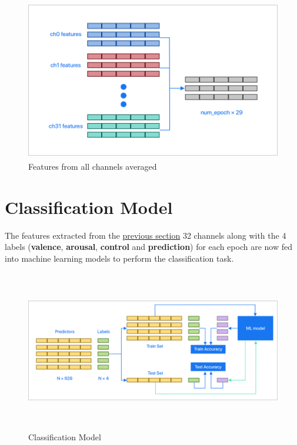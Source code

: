 \begin{figure}[H]
\centering
\includegraphics[height=7cm]{Figures/feat_channel_avg.png}
\caption{Features from all channels averaged}
\label{fig23}
\end{figure}

\section{Classification Model}

The features extracted from the \hyperref[sec:featureExtraction]{previous section} 32 channels along with the 4 labels (\textbf{valence}, \textbf{arousal}, \textbf{control} and \textbf{prediction}) for each epoch are now fed into machine learning models to perform the classification task.

\begin{figure}[H]
\hspace*{-1.5cm}
\includegraphics[height=7cm]{Figures/train_test.png}
\caption{Classification Model}
\label{fig23}
\end{figure}


